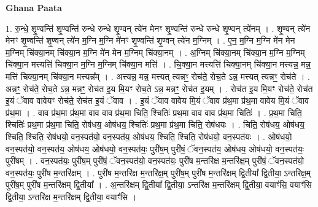 \documentclass[17pt]{extarticle}
\begin{document}
\textbf{Ghana Paata } \newline

1. रु॒न्धे॒ शृ॒ण्वन्ति॑ शृ॒ण्वन्ति॑ रुन्धे रुन्धे शृ॒ण्वन् त्ये॑न मेनꣳ शृ॒ण्वन्ति॑ रुन्धे रुन्धे शृ॒ण्वन् त्ये॑नम् । . शृ॒ण्वन् त्ये॑न मेनꣳ शृ॒ण्वन्ति॑ शृ॒ण्वन् त्ये॑न म॒ग्नि म॒ग्नि मे॑नꣳ शृ॒ण्वन्ति॑ शृ॒ण्वन् त्ये॑न म॒ग्निम् । . ए॒न॒ म॒ग्नि म॒ग्नि मे॑न मेन म॒ग्निम् चि॑क्या॒नम् चि॑क्या॒न म॒ग्नि मे॑न मेन म॒ग्निम् चि॑क्या॒नम् । . अ॒ग्निम् चि॑क्या॒नम् चि॑क्या॒न म॒ग्नि म॒ग्निम् चि॑क्या॒न मत्त्यत्ति॑ चिक्या॒न म॒ग्नि म॒ग्निम् चि॑क्या॒न मत्ति॑ । . चि॒क्या॒न मत्त्यत्ति॑ चिक्या॒नम् चि॑क्या॒न मत्त्यन्न॒ मन्न॒ मत्ति॑ चिक्या॒नम् चि॑क्या॒न मत्त्यन्न᳚म् । . अत्त्यन्न॒ मन्न॒ मत्त्यत् त्यन्नꣳ॒॒ रोच॑ते॒ रोच॒ते ऽन्न॒ मत्त्यत् त्यन्नꣳ॒॒ रोच॑ते । . अन्नꣳ॒॒ रोच॑ते॒ रोच॒ते ऽन्न॒ मन्नꣳ॒॒ रोच॑त इ॒य मि॒यꣳ रोच॒ते ऽन्न॒ मन्नꣳ॒॒ रोच॑त इ॒यम् । . रोच॑त इ॒य मि॒यꣳ रोच॑ते॒ रोच॑त इ॒यं ॅवाव वावेयꣳ रोच॑ते॒ रोच॑त इ॒यं ॅवाव । . इ॒यं ॅवाव वावेय मि॒यं ॅवाव प्र॑थ॒मा प्र॑थ॒मा वावेय मि॒यं ॅवाव प्र॑थ॒मा । . वाव प्र॑थ॒मा प्र॑थ॒मा वाव वाव प्र॑थ॒मा चिति॒ श्चितिः॑ प्रथ॒मा वाव वाव प्र॑थ॒मा चितिः॑ । . प्र॒थ॒मा चिति॒ श्चितिः॑ प्रथ॒मा प्र॑थ॒मा चिति॒ रोष॑धय॒ ओष॑धय॒ श्चितिः॑ प्रथ॒मा प्र॑थ॒मा चिति॒ रोष॑धयः । . चिति॒ रोष॑धय॒ ओष॑धय॒ श्चिति॒ श्चिति॒ रोष॑धयो॒ वन॒स्पत॑यो॒ वन॒स्पत॑य॒ ओष॑धय॒ श्चिति॒ श्चिति॒ रोष॑धयो॒ वन॒स्पत॑यः । . ओष॑धयो॒ वन॒स्पत॑यो॒ वन॒स्पत॑य॒ ओष॑धय॒ ओष॑धयो॒ वन॒स्पत॑यः॒ पुरी॑ष॒म् पुरी॑षं॒ ॅवन॒स्पत॑य॒ ओष॑धय॒ ओष॑धयो॒ वन॒स्पत॑यः॒ पुरी॑षम् । . वन॒स्पत॑यः॒ पुरी॑ष॒म् पुरी॑षं॒ ॅवन॒स्पत॑यो॒ वन॒स्पत॑यः॒ पुरी॑ष म॒न्तरि॑क्ष म॒न्तरि॑क्ष॒म् पुरी॑षं॒ ॅवन॒स्पत॑यो॒ वन॒स्पत॑यः॒ पुरी॑ष म॒न्तरि॑क्षम् । . पुरी॑ष म॒न्तरि॑क्ष म॒न्तरि॑क्ष॒म् पुरी॑ष॒म् पुरी॑ष म॒न्तरि॑क्षम् द्वि॒तीया᳚ द्वि॒तीया॒ ऽन्तरि॑क्ष॒म् पुरी॑ष॒म् पुरी॑ष म॒न्तरि॑क्षम् द्वि॒तीया᳚ । . अ॒न्तरि॑क्षम् द्वि॒तीया᳚ द्वि॒तीया॒ ऽन्तरि॑क्ष म॒न्तरि॑क्षम् द्वि॒तीया॒ वयाꣳ॑सि॒ वयाꣳ॑सि द्वि॒तीया॒ ऽन्तरि॑क्ष म॒न्तरि॑क्षम् द्वि॒तीया॒ वयाꣳ॑सि । \newline
\end{document}
